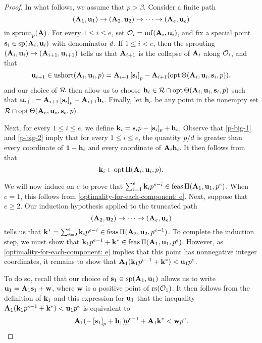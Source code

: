 \documentclass{amsart}
\begin{document}
\begin{proof}
    In what follows, we assume that $p > \beta$.
    Consider a finite path
    \[ (\mathbf{A}_1, \mathbf{u}_1) \to (\mathbf{A}_2, \mathbf{u}_2) \to \cdots \to (\mathbf{A}_e, \mathbf{u}_e) \]
    in $\operatorname{sprout}_p(\mathbf{A})$.
    For every $1 \leq i \leq e$, set $\mathcal{O}_i = \operatorname{mf}(\mathbf{A}_i, \mathbf{u}_i)$, and fix a special point $\mathbf{s}_i \in \operatorname{sp}(\mathbf{A}_i, \mathbf{u}_i)$ with denominator $d$.
    If $1 \leq i < e$, then the sprouting $(\mathbf{A}_i, \mathbf{u}_i) \to (\mathbf{A}_{i+1}, \mathbf{u}_{i+1})$ tells us that $\mathbf{A}_{i+1}$ is the collapse of $\mathbf{A}_i$ along $\mathcal{O}_i$, and that
    \[
       \mathbf{u}_{i+1} \in \operatorname{ushort}(\mathbf{A}_i, \mathbf{u}_i, p)= \mathbf{A}_{i+1} \left[ \mathbf{s}_i \right]_p - \mathbf{A}_{i+1}(\operatorname{opt} \Theta( \mathbf{A}_i, \mathbf{u}_i, \mathbf{s}_i, p)).
    \]
     and our choice of $\mathcal{R}$ then allow us to choose $\mathbf{h}_i \in \mathcal{R} \cap \operatorname{opt} \Theta ( \mathbf{A}_i, \mathbf{u}_i, \mathbf{s}_i, p)$ such that $\mathbf{u}_{i+1} = \mathbf{A}_{i+1} \left[ \mathbf{s}_i \right]_p - \mathbf{A}_{i+1} \mathbf{h}_i$.
    Finally, let $\mathbf{h}_e$ be any point in the nonempty set $\mathcal{R} \cap \operatorname{opt} \Theta ( \mathbf{A}_e, \mathbf{u}_e, \mathbf{s}_e, p)$.

    Next, for every $1 \leq i \leq e$,  we define $\mathbf{k}_i = \mathbf{s}_i p - [\mathbf{s}_i]_p + \mathbf{h}_i$.
    Observe that \eqref{p-big-1} and \eqref{p-big-2} imply that for every $1 \leq i \leq e$, the quantity $p/d$ is greater than every coordinate of $\mathbf{1}-\mathbf{h}_i$ and every coordinate of $\mathbf{A}_i \mathbf{h}_i$.
    It then follows from  that
    \begin{equation}
       \label{optimality-for-each-component: e}
       \mathbf{k}_i \in \operatorname{opt} \Pi(\mathbf{A}_i, \mathbf{u}_i,p).
    \end{equation}

    We will now induce on $e$ to prove that $\sum_{i=1}^e \mathbf{k}_i p^{e-i} \in \operatorname{feas}\Pi(\mathbf{A}_1, \mathbf{u}_1, p^e)$.
    When $e = 1$, this follows from \eqref{optimality-for-each-component: e}.
    Next, suppose that $e \geq 2$.
    Our induction hypothesis applied to the truncated path
    \[ (\mathbf{A}_2, \mathbf{u}_2) \to \cdots \to (\mathbf{A}_e, \mathbf{u}_e) \]
    tells us that $\mathbf{k}^{\ast} = \sum_{i=2}^e \mathbf{k}_i p^{e-i} \in \operatorname{feas} \Pi(\mathbf{A}_2, \mathbf{u}_2, p^{e-1})$.
    To complete the induction step, we must show that $\mathbf{k}_1 p^{e-1} + \mathbf{k}^{\ast} \in \operatorname{feas}\Pi(\mathbf{A}_1, \mathbf{u}_1, p^e)$.
    However, as \eqref{optimality-for-each-component: e} implies that this point has nonnegative integer coordinates, it remains to show that $\mathbf{A}_1 ( \mathbf{k}_1 p^{e-1} + \mathbf{k}^{\ast} ) < \mathbf{u}_1 p^e$.

    To do so, recall that our choice of $\mathbf{s}_1 \in \operatorname{sp}(\mathbf{A}_1, \mathbf{u}_1)$ allows us to write $\mathbf{u}_1 = \mathbf{A}_1 \mathbf{s}_1 + \mathbf{w}$, where $\mathbf{w}$ is a positive point of $\operatorname{rs}(\mathcal{O}_1)$.
    It then follows from the definition of $\mathbf{k}_1$ and this expression for $\mathbf{u}_1$ that the inequality $\mathbf{A}_1 ( \mathbf{k}_1 p^{e-1} + \mathbf{k}^{\ast} ) < \mathbf{u}_1 p^e$ is equivalent to
    \begin{equation}
       \label{target-inequality: e}
       \mathbf{A}_1( - \left[ \mathbf{s}_1 \right]_p + \mathbf{h}_1 ) p^{e-1} + \mathbf{A}_1\mathbf{k}^{\ast} < \mathbf{w} p^e.
    \end{equation}


\end{proof}
\end{document}
